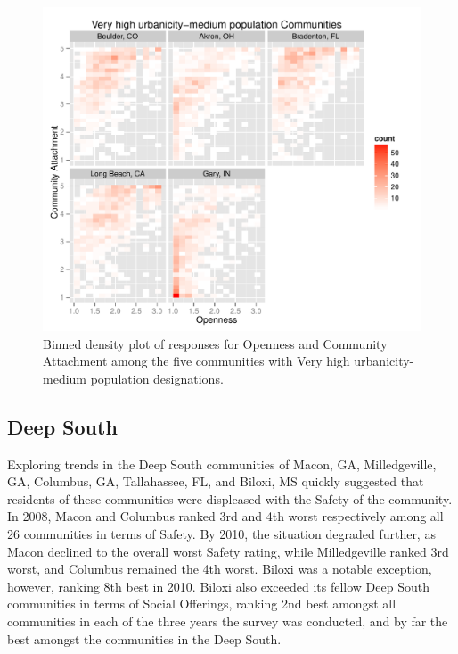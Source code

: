 \documentclass[11pt]{article}\usepackage{knitr}
\begin{document}
\begin{knitrout}
\color{fgcolor}\begin{figure}[H]


{\centering \includegraphics[width=\maxwidth]{figure/west_one} 

}

\caption[Binned density plot of responses for Openness and Community Attachment among the five communities with Very high urbanicity-medium population designations]{Binned density plot of responses for Openness and Community Attachment among the five communities with Very high urbanicity-medium population designations.\label{fig:west_one}}
\end{figure}


\end{knitrout}


\subsection{Deep South}
Exploring trends in the Deep South communities of Macon, GA, Milledgeville, GA, Columbus, GA, Tallahassee, FL, and Biloxi, MS quickly suggested that residents of these communities were displeased with the Safety of the community. In 2008, Macon and Columbus ranked 3rd and 4th worst respectively among all 26 communities in terms of Safety. By 2010, the situation degraded further, as Macon declined to the overall worst Safety rating, while Milledgeville ranked 3rd worst, and Columbus remained the 4th worst. Biloxi was a notable exception, however, ranking 8th best in 2010. Biloxi also exceeded its fellow Deep South communities in terms of Social Offerings, ranking 2nd best amongst all communities in each of the three years the survey was conducted, and by far the best amongst the communities in the Deep South.
\end{document}
